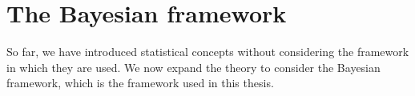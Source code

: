 




\section{The Bayesian framework}
So far, we have introduced statistical concepts without considering the framework in which they are used.
We now expand the theory to consider the Bayesian framework, which is the framework used in this thesis.
